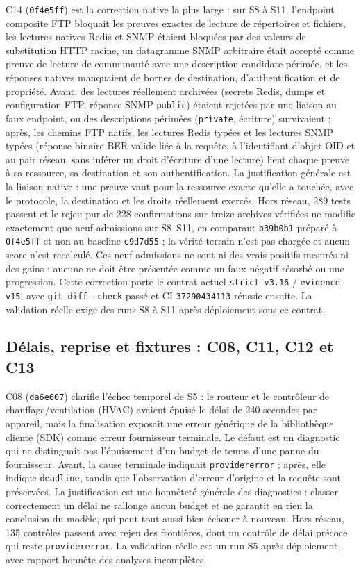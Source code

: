 \documentclass[11pt,a4paper]{article}
\newcommand{\code}[1]{{\urlstyle{tt}\nolinkurl{#1}}}
\begin{document}
C14 (\code{0f4e5ff}) est la correction native la plus large : sur S8 à S11, l'endpoint composite FTP bloquait les preuves exactes de lecture de répertoires et fichiers, les lectures natives Redis et SNMP étaient bloquées par des valeurs de substitution HTTP racine, un datagramme SNMP arbitraire était accepté comme preuve de lecture de communauté avec une description candidate périmée, et les réponses natives manquaient de bornes de destination, d'authentification et de propriété. Avant, des lectures réellement archivées (secrets Redis, dumps et configuration FTP, réponse SNMP \code{public}) étaient rejetées par une liaison au faux endpoint, ou des descriptions périmées (\code{private}, écriture) survivaient ; après, les chemins FTP natifs, les lectures Redis typées et les lectures SNMP typées (réponse binaire BER valide liée à la requête, à l'identifiant d'objet OID et au pair réseau, sans inférer un droit d'écriture d'une lecture) lient chaque preuve à sa ressource, sa destination et son authentification. La justification générale est la liaison native : une preuve vaut pour la ressource exacte qu'elle a touchée, avec le protocole, la destination et les droits réellement exercés. Hors réseau, 289 tests passent et le rejeu pur de 228 confirmations sur treize archives vérifiées ne modifie exactement que neuf admissions sur S8--S11, en comparant \code{b39b0b1} préparé à \code{0f4e5ff} et non au baseline \code{e9d7d55} ; la vérité terrain n'est pas chargée et aucun score n'est recalculé. Ces neuf admissions ne sont ni des vrais positifs mesurés ni des gains : aucune ne doit être présentée comme un faux négatif résorbé ou une progression. Cette correction porte le contrat actuel \code{strict-v3.16} / \code{evidence-v15}, avec \texttt{git diff --check} passé et CI \code{37290434113} réussie ensuite. La validation réelle exige des runs S8 à S11 après déploiement sous ce contrat.

\subsection{Délais, reprise et fixtures : C08, C11, C12 et C13}
\label{sec:delais}

C08 (\code{da6e607}) clarifie l'échec temporel de S5 : le routeur et le contrôleur de chauffage/ventilation (HVAC) avaient épuisé le délai de 240 secondes par appareil, mais la finalisation exposait une erreur générique de la bibliothèque cliente (SDK) comme erreur fournisseur terminale. Le défaut est un diagnostic qui ne distinguait pas l'épuisement d'un budget de temps d'une panne du fournisseur. Avant, la cause terminale indiquait \code{providererror} ; après, elle indique \code{deadline}, tandis que l'observation d'erreur d'origine et la requête sont préservées. La justification est une honnêteté générale des diagnostics : classer correctement un délai ne rallonge aucun budget et ne garantit en rien la conclusion du modèle, qui peut tout aussi bien échouer à nouveau. Hors réseau, 135 contrôles passent avec rejeu des frontières, dont un contrôle de délai précoce qui reste \code{providererror}. La validation réelle est un run S5 après déploiement, avec rapport honnête des analyses incomplètes.
\end{document}
